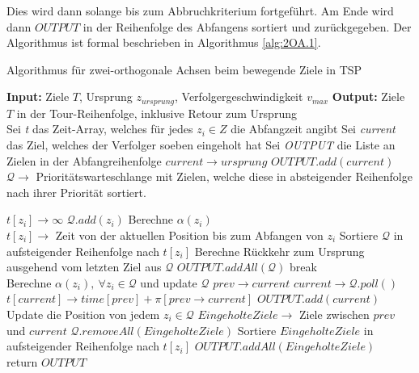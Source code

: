 \documentclass[german,version-2019-11]{uzl-thesis}
\begin{document}
Dies wird dann solange bis zum Abbruchkriterium fortgeführt. Am Ende wird dann $OUTPUT$ in der Reihenfolge des Abfangens sortiert und zurückgegeben. Der Algorithmus ist formal beschrieben in Algorithmus \ref{alg:2OA.1}.

\newpage
\begin{minipage}{1\linewidth}
\begin{algorithm}[H]
\begin{algorithmic}
\caption{Algorithmus für zwei-orthogonale Achsen beim bewegende Ziele in TSP}
\label{alg:2OA.1}
\State \textbf{Input:} Ziele $T$, Ursprung $z_{ursprung}$, Verfolgergeschwindigkeit $v_{max}$
\State \textbf{Output:} Ziele $T$ in der Tour-Reihenfolge, inklusive Retour zum Ursprung\\

\State Sei \emph{t} das Zeit-Array, welches für jedes $z_i\in Z$ die Abfangzeit angibt
\State Sei \emph{current} das Ziel, welches der Verfolger soeben eingeholt hat
\State Sei \emph{OUTPUT} die Liste an Zielen in der Abfangreihenfolge
\State $current\rightarrow ursprung$
\State $OUTPUT.add(current)$
\State $\mathcal{Q} \rightarrow$ Prioritätswarteschlange mit Zielen, welche diese in absteigender Reihenfolge nach ihrer Priorität sortiert. 

\State $t[z_i] \rightarrow \infty$
\State $\mathcal{Q}.add(z_i)$
\State Berechne $\alpha(z_i)$
\EndFor\\

\State $t[z_i] \rightarrow$ Zeit von der aktuellen Position bis zum Abfangen von $z_i$
\EndFor
\State Sortiere $\mathcal{Q}$ in aufsteigender Reihenfolge nach $t[z_i]$
\State Berechne Rückkehr zum Ursprung ausgehend vom letzten Ziel aus $\mathcal{Q}$
\State $OUTPUT.addAll(\mathcal{Q})$
\State break
\EndIf \\

\State Berechne $\alpha(z_i),~\forall z_i\in\mathcal{Q}$ und update $\mathcal{Q}$
\State $prev\rightarrow current$
\State $current \rightarrow \mathcal{Q}.poll()$
\State $t[current] \rightarrow time[prev] + \pi[prev\rightarrow current]$
\State $OUTPUT.add(current)$
\State Update die Position von jedem $z_i\in\mathcal{Q}$
\State $EingeholteZiele \rightarrow$ Ziele zwischen $prev$ und $current$
\State $\mathcal{Q}.removeAll(EingeholteZiele)$
\State Sortiere $EingeholteZiele$ in aufsteigender Reihenfolge nach $t[z_i]$
\State $OUTPUT.addAll(EingeholteZiele)$
\EndWhile\\

\State return $OUTPUT$

\end{algorithmic}
\end{algorithm}
\end{minipage}
\end{document}
